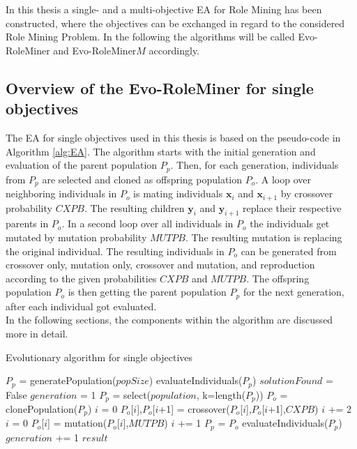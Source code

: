 In this thesis a single- and a multi-objective EA for Role Mining has been constructed, where the objectives can be exchanged in regard to the considered Role Mining Problem. In the following the algorithms will be called Evo-RoleMiner and Evo-RoleMiner$M$ accordingly. 

    \subsection{Overview of the Evo-RoleMiner for single objectives}
    The EA for single objectives used in this thesis is based on the pseudo-code in Algorithm \ref{alg:EA}. The algorithm starts with the initial generation and evaluation of the parent population $P_p$. Then, for each generation, individuals from $P_p$ are selected and cloned as offspring population $P_o$. A loop over neighboring individuals in $P_o$ is mating individuals $\mathbf{x}_i$ and $\mathbf{x}_{i+1}$ by crossover probability $CXPB$. The resulting children $\mathbf{y}_i$ and $\mathbf{y}_{i+1}$ replace their respective parents in $P_o$. In a second loop over all individuals in $P_o$ the individuals get mutated by mutation probability $MUTPB$. The resulting mutation is replacing the original individual. The resulting individuals in $P_o$ can be generated from crossover only, mutation only, crossover and mutation, and reproduction according to the given probabilities $CXPB$ and $MUTPB$. The offspring population $P_o$ is then getting the parent population $P_p$ for the next generation, after each individual got evaluated.\\
    In the following sections, the components within the algorithm are discussed more in detail.
    
    \begin{algorithm}
        \caption{Evolutionary algorithm for single objectives}
        \label{alg:EA}
        \begin{algorithmic}[1]
                \State $P_p$ = generatePopulation($popSize$)
                \State evaluateIndividuals($P_p$)
                \State $solutionFound$ = False
                \State $generation$ = 1
                    \State $P_p$ = select($population$, k=length($P_p$))
                    \State $P_o$ = clonePopulation($P_p$)
                    \State $i$ = 0
                        \State $P_o$[$i$],$P_o$[$i$+1] = crossover($P_o$[$i$],$P_o$[$i$+1],$CXPB$)
                        \State $i$ += 2
                    \EndWhile
                    \State $i$ = 0
                        \State $P_o$[$i$] = mutation($P_o$[$i$],$MUTPB$)
                        \State $i$ += 1
                    \EndWhile
                    \State $P_p$ = $P_o$
                    \State evaluateIndividuals($P_p$)
                    \State $generation$ += 1
                \EndWhile
                \State \Return $result$
            \EndProcedure
        \end{algorithmic}
    \end{algorithm}

